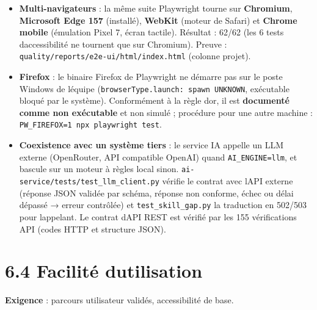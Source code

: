 \documentclass[
  11pt,
]{article}
\providecommand{\tightlist}{%
  \setlength{\itemsep}{0pt}\setlength{\parskip}{0pt}}
\begin{document}
\begin{itemize}
\tightlist
\item
  \textbf{Multi-navigateurs} : la même suite Playwright tourne sur
  \textbf{Chromium}, \textbf{Microsoft Edge 157} (installé),
  \textbf{WebKit} (moteur de Safari) et \textbf{Chrome mobile}
  (émulation Pixel 7, écran tactile). Résultat : 62/62 (les 6 tests
  d\textquotesingle accessibilité ne tournent que sur Chromium). Preuve
  :
  \texttt{quality/}\allowbreak{}\texttt{reports/}\allowbreak{}\texttt{e2e-}\allowbreak{}\texttt{ui/}\allowbreak{}\texttt{html/}\allowbreak{}\texttt{index.}\allowbreak{}\texttt{html}
  (colonne projet).
\item
  \textbf{Firefox} : le binaire Firefox de Playwright ne démarre pas sur
  le poste Windows de l\textquotesingle équipe
  (\texttt{browser}\allowbreak{}\texttt{Type.}\allowbreak{}\texttt{launch:\ spawn\ }\allowbreak{}\texttt{UNKNOWN},
  exécutable bloqué par le système). Conformément à la règle
  d\textquotesingle or, il est \textbf{documenté comme non exécutable}
  et non simulé ; procédure pour une autre machine :
  \texttt{PW\_}\allowbreak{}\texttt{FIREFOX=1\ npx\ playwright\ test}.
\item
  \textbf{Coexistence avec un système tiers} : le service IA appelle un
  LLM externe (OpenRouter, API compatible OpenAI) quand
  \texttt{AI\_ENGINE=llm}, et bascule sur un moteur à règles local
  sinon.
  \texttt{ai-}\allowbreak{}\texttt{service/}\allowbreak{}\texttt{tests/}\allowbreak{}\texttt{test\_}\allowbreak{}\texttt{llm\_}\allowbreak{}\texttt{client.}\allowbreak{}\texttt{py}
  vérifie le contrat avec l\textquotesingle API externe (réponse JSON
  validée par schéma, réponse non conforme, échec ou délai dépassé →
  erreur contrôlée) et \texttt{test\_skill\_gap.py} la traduction en
  502/503 pour l\textquotesingle appelant. Le contrat
  d\textquotesingle API REST est vérifié par les 155 vérifications API
  (codes HTTP et structure JSON).
\end{itemize}

\section{6.4 Facilité
d\textquotesingle utilisation}\label{64-facilituxe9-dutilisation}

\textbf{Exigence} : parcours utilisateur validés, accessibilité de base.
\end{document}
